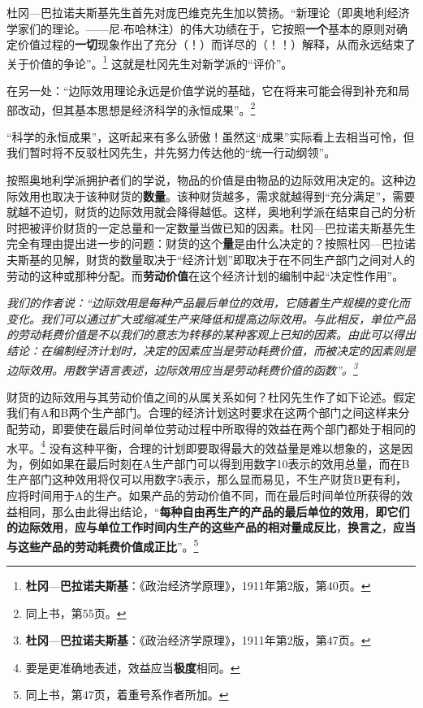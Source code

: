 \documentclass[fontset=fandol, a4paper, 12pt, openright]{ctexbook}
\renewenvironment{quote}
  {\list{}{\rightmargin\leftmargin}%
   \item\relax\small\itshape\color{darkgray}}
  {\endlist}
\begin{document}
杜冈—巴拉诺夫斯基先生首先对庞巴维克先生加以赞扬。“新理论（即奥地利经济学家们的理论。——尼$\cdot$布哈林注）的伟大功绩在于，它按照\textbf{一个}基本的原则对确定价值过程的\textbf{一切}现象作出了充分（！）而详尽的（！！）解释，从而永远结束了关于价值的争论”。\footnote{\textbf{杜冈}—\textbf{巴拉诺夫斯基}：《政治经济学原理》，1911年第2版，第40页。} 这就是杜冈先生对新学派的“评价”。

在另一处：“边际效用理论永远是价值学说的基础，它在将来可能会得到补充和局部改动，但其基本思想是经济科学的永恒成果”。\footnote{同上书，第55页。}

“科学的永恒成果”，这听起来有多么骄傲！虽然这“成果”实际看上去相当可怜，但我们暂时将不反驳杜冈先生，并先努力传达他的“统一行动纲领”。

按照奥地利学派拥护者们的学说，物品的价值是由物品的边际效用决定的。这种边际效用也取决于该种财货的\textbf{数量}。该种财货越多，需求就越得到“充分满足”，需要就越不迫切，财货的边际效用就会降得越低。这样，奥地利学派在结束自己的分析时把被评价财货的一定总量和一定数量当做已知的因素。杜冈—巴拉诺夫斯基先生完全有理由提出进一步的问题：财货的这个\textbf{量}是由什么决定的？按照杜冈—巴拉诺夫斯基的见解，财货的数量取决于“经济计划”即取决于在不同生产部门之间对人的劳动的这种或那种分配。而\textbf{劳动价值}在这个经济计划的编制中起“决定性作用”。

\begin{quote}
我们的作者说：“边际效用是每种产品最后单位的效用，它随着生产规模的变化而变化。我们可以通过扩大或缩减生产来降低和提高边际效用。与此相反，单位产品的劳动耗费价值是不以我们的意志为转移的某种客观上已知的因素。由此可以得出结论：在编制经济计划时，决定的因素应当是劳动耗费价值，而被决定的因素则是边际效用。用数学语言表述，边际效用应当是劳动耗费价值的函数”。\footnote{\textbf{杜冈}—\textbf{巴拉诺夫斯基}：《政治经济学原理》，1911年第2版，第47页。}
\end{quote}

财货的边际效用与其劳动价值之间的从属关系如何？杜冈先生作了如下论述。假定我们有A和B两个生产部门。合理的经济计划这时要求在这两个部门之间这样来分配劳动，即要使在最后时间单位劳动过程中所取得的效益在两个部门都处于相同的水平。\footnote{要是更准确地表述，效益应当\textbf{极度}相同。} 没有这种平衡，合理的计划即要取得最大的效益量是难以想象的，这是因为，例如如果在最后时刻在A生产部门可以得到用数字10表示的效用总量，而在B生产部门这种效用将仅可以用数字5表示，那么显而易见，不生产财货B更有利，应将时间用于A的生产。如果产品的劳动价值不同，而在最后时间单位所获得的效益相同，那么由此得出结论，“\textbf{每种自由再生产的产品的最后单位的效用}，\textbf{即它们的边际效用}，\textbf{应与单位工作时间内生产的这些产品的相对量成反比}，\textbf{换言之}，\textbf{应当与这些产品的劳动耗费价值成正比}”。\footnote{同上书，第47页，着重号系作者所加。}
\end{document}
